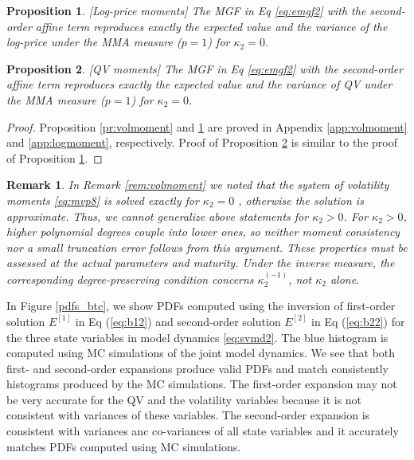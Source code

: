 \documentclass[11pt,a4paper] {article}
\newtheorem{proposition}{Proposition}[section]
\newtheorem*{remark}{Remark}%
\begin{document}
\begin{proposition}\label{pr:logmoment} [Log-price moments] The MGF in Eq \eqref{eq:emgf2} with the second-order affine term reproduces exactly the expected value and the variance of the log-price under the MMA measure ($p=1$) for $\kappa_{2}=0$.
\end{proposition}

\begin{proposition}\label{pr:qvarmoment} [QV moments] The MGF in Eq \eqref{eq:emgf2} with the second-order affine term  reproduces exactly the expected value and the variance of QV under the MMA measure ($p=1$) for $\kappa_{2}=0$.
\end{proposition}

\begin{proof}
Proposition \ref{pr:volmoment} and \ref{pr:logmoment} are proved in Appendix \ref{app:volmoment} and \ref{app:logmoment}, respectively. Proof of Proposition \ref{pr:qvarmoment}  is similar to the proof of Proposition \ref{pr:logmoment}. 
\end{proof}

\begin{remark}\label{rem:volmoment2}
In Remark \ref{rem:volmoment} we noted that the system of volatility moments \eqref{eq:mvp8} is solved exactly for $\kappa_{2}=0$ , otherwise the solution is approximate. Thus, we cannot generalize above statements for $\kappa_{2}>0$. For $\kappa_2>0$, higher polynomial degrees couple into lower ones, so neither moment consistency nor a small truncation error follows from this argument. These properties must be assessed at the actual parameters and maturity. Under the inverse measure, the corresponding degree-preserving condition concerns $\kappa_2^{(-1)}$, not $\kappa_2$ alone.
\end{remark}


In Figure \ref{pdfs_btc}, we show PDFs computed using the inversion of first-order solution $E^{[1]}$ in Eq (\ref{eq:b12}) and second-order solution $E^{[2]}$ in Eq (\ref{eq:b22}) for the three state variables in model dynamics \eqref{eq:svmd2}. The blue histogram is computed using MC simulations of the joint model dynamics. We see that both first- and second-order expansions produce valid PDFs and match consistently histograms produced by the MC simulations. The first-order expansion may not be very accurate for the QV and the volatility variables because it is not consistent with variances of these variables. The second-order expansion is consistent with variances anc co-variances of all state variables and it accurately matches PDFs computed using MC simulations.
\end{document}
